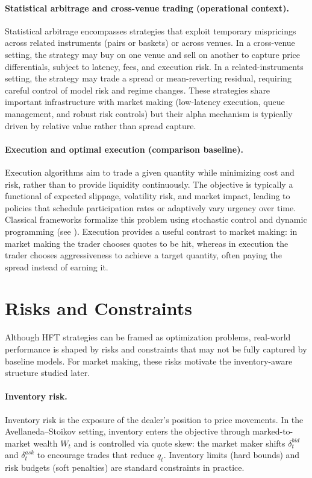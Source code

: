 \documentclass[a4paper,10pt,titlepage,oneside,openany]{book}
\newcommand{\textcite}[1]{\cite{#1}}
\theoremstyle{plain}\newtheorem{theorem}{Theorem}[chapter]
\theoremstyle{definition}\newtheorem{definition}{Definition}[chapter]
\theoremstyle{remark}\newtheorem{remark}{Remark}[chapter]
\begin{document}
\paragraph{Statistical arbitrage and cross-venue trading (operational context).}
Statistical arbitrage encompasses strategies that exploit temporary mispricings across related instruments (pairs or baskets) or across venues. In a cross-venue setting, the strategy may buy on one venue and sell on another to capture price differentials, subject to latency, fees, and execution risk. In a related-instruments setting, the strategy may trade a spread or mean-reverting residual, requiring careful control of model risk and regime changes. These strategies share important infrastructure with market making (low-latency execution, queue management, and robust risk controls) but their alpha mechanism is typically driven by relative value rather than spread capture.

\paragraph{Execution and optimal execution (comparison baseline).}
Execution algorithms aim to trade a given quantity while minimizing cost and risk, rather than to provide liquidity continuously. The objective is typically a functional of expected slippage, volatility risk, and market impact, leading to policies that schedule participation rates or adaptively vary urgency over time. Classical frameworks formalize this problem using stochastic control and dynamic programming (see \textcite{CarteaJaimungalPenalva2015}). Execution provides a useful contrast to market making: in market making the trader chooses quotes to be hit, whereas in execution the trader chooses aggressiveness to achieve a target quantity, often paying the spread instead of earning it.

\section{Risks and Constraints}
Although HFT strategies can be framed as optimization problems, real-world performance is shaped by risks and constraints that may not be fully captured by baseline models. For market making, these risks motivate the inventory-aware structure studied later.

\paragraph{Inventory risk.}
Inventory risk is the exposure of the dealer's position to price movements. In the Avellaneda--Stoikov setting, inventory enters the objective through marked-to-market wealth $W_t$ and is controlled via quote skew: the market maker shifts $\delta_t^{bid}$ and $\delta_t^{ask}$ to encourage trades that reduce $q_t$. Inventory limits (hard bounds) and risk budgets (soft penalties) are standard constraints in practice.
\end{document}

